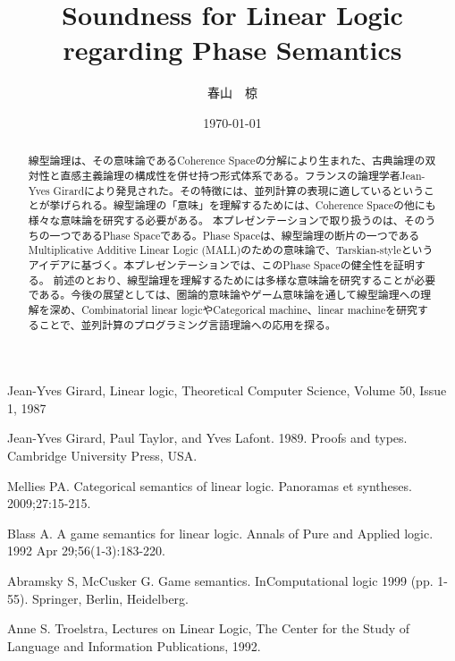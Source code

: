 \documentclass{jarticle}
\title{Soundness for Linear Logic regarding Phase Semantics}
\author{春山　椋}
\date{\today}
\theoremstyle{break} %
\theoremstyle{definition}
\begin{document}
\maketitle

\begin{abstract}
  線型論理\cite{girard87}は、その意味論であるCoherence Space\cite{prot}の分解により生まれた、古典論理の双対性と直感主義論理の構成性を併せ持つ形式体系である。フランスの論理学者Jean-Yves Girardにより発見された。その特徴には、並列計算の表現に適しているということが挙げられる。線型論理の「意味」を理解するためには、Coherence Spaceの他にも様々な意味論を研究する必要がある。
本プレゼンテーションで取り扱うのは、そのうちの一つであるPhase Space\cite{girard87}である。Phase Spaceは、線型論理の断片の一つであるMultiplicative Additive Linear Logic (MALL)のための意味論で、Tarskian-styleというアイデアに基づく。本プレゼンテーションでは、このPhase Spaceの健全性を証明する。
前述のとおり、線型論理を理解するためには多様な意味論を研究することが必要である。今後の展望としては、圏論的意味論\cite{mellies09}やゲーム意味論\cite{blass92}\cite{abra99}を通して線型論理への理解を深め、Combinatorial linear logicやCategorical machine、linear machine\cite{tor}を研究することで、並列計算のプログラミング言語理論への応用を探る。
\end{abstract}

\begin{thebibliography}{99}
  Jean-Yves Girard,
  Linear logic,
  Theoretical Computer Science,
  Volume 50, Issue 1,
  1987

  Jean-Yves Girard, 
  Paul Taylor, 
  and Yves Lafont. 
  1989. 
  Proofs and types. 
  Cambridge University Press, 
  USA.

  Mellies PA.
  Categorical semantics of linear logic.
  Panoramas et syntheses.
  2009;27:15-215.
  
  Blass A.
  A game semantics for linear logic.
  Annals of Pure and Applied logic.
  1992 Apr 29;56(1-3):183-220.
  
  Abramsky S, McCusker G.
  Game semantics.
  InComputational logic 1999 (pp. 1-55).
  Springer, Berlin, Heidelberg.
  
  Anne S. Troelstra,
  Lectures on Linear Logic,
  The Center for the Study of Language and Information Publications,
  1992.
\end{thebibliography}
\end{document}
